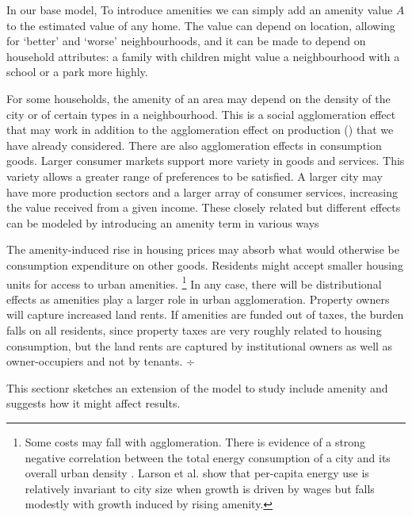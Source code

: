 

In our base model,  To introduce amenities we can simply add an amenity value $A$ to the estimated value of any home. The value can depend on location, allowing for `better' and `worse' neighbourhoods,  and it can be made to depend on household attributes: a family with children might value a neighbourhood with a school or a park more highly. 

For some households, the amenity of an area may depend on the density of the city or of certain types in a neighbourhood. This is a social agglomeration effect that may work in addition to the agglomeration effect on production (\cite{gurwitzCatastrophicAgglomeration2019}) that we have already considered. There are also agglomeration effects in consumption goods. Larger consumer markets support more variety in goods and services. This variety allows a greater range of preferences to be satisfied. A larger city may have more production sectors and a larger array of consumer services, increasing the value received from a given income.  These closely related but different effects can be modeled by introducing an amenity term in various ways 

The amenity-induced rise in housing prices may absorb what would otherwise be consumption expenditure on other goods. Residents might accept smaller housing units for access to urban amenities. \footnote{Some costs may fall with agglomeration. There is evidence of a strong negative correlation between the total energy consumption of a city and its overall urban density \cite{NewmanPeterJeffrey}. Larson et al. \cite{larsonEnergyImplicationsCity2015} show that per-capita energy use is relatively invariant to city size when growth is driven by wages but falls modestly with growth induced by rising amenity.} In any case, there will be distributional effects as amenities play a larger role in urban agglomeration. Property owners will capture increased land rents. If amenities are funded out of taxes, the burden falls on all residents, since property taxes are very roughly related to housing consumption, but the land rents are captured by institutional owners as well as owner-occupiers and not by tenants.
÷

 This sectionr sketches an extension of the model to study include \gls{amenity} and suggests how it might affect results. 

